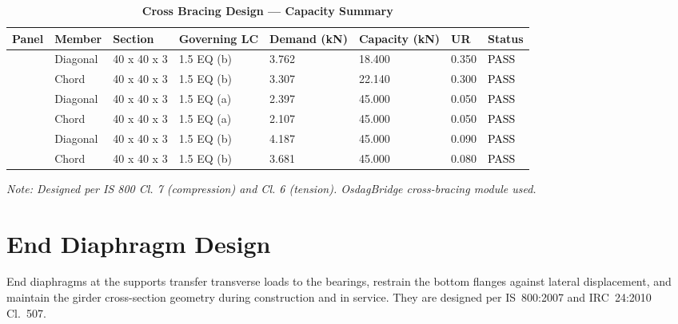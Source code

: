 \documentclass[12pt,a4paper]{report}
\numberwithin{table}{chapter}
\numberwithin{figure}{chapter}
\begin{document}
\vspace{1em}
\begin{longtable}{|C{2.0cm}|L{1.8cm}|C{2.2cm}|C{3.0cm}|C{1.8cm}|C{1.8cm}|C{1.2cm}|C{1.8cm}|}
\caption{\textbf{Cross Bracing Design --- Capacity Summary}}
\hline
\textbf{Panel} & \textbf{Member} & \textbf{Section} & \textbf{Governing LC} & \textbf{Demand (kN)} & \textbf{Capacity (kN)} & \textbf{UR} & \textbf{Status} \\[6pt]
\hline
{} & Diagonal & 40 x 40 x 3 & 1.5 EQ (b) & 3.762 & 18.400 & 0.350 & \textcolor{black}{PASS} \\[6pt]
 & Chord & 40 x 40 x 3 & 1.5 EQ (b) & 3.307 & 22.140 & 0.300 & \textcolor{black}{PASS} \\[6pt]
\hline
{} & Diagonal & 40 x 40 x 3 & 1.5 EQ (a) & 2.397 & 45.000 & 0.050 & \textcolor{black}{PASS} \\[6pt]
 & Chord & 40 x 40 x 3 & 1.5 EQ (a) & 2.107 & 45.000 & 0.050 & \textcolor{black}{PASS} \\[6pt]
\hline
{} & Diagonal & 40 x 40 x 3 & 1.5 EQ (b) & 4.187 & 45.000 & 0.090 & \textcolor{black}{PASS} \\[6pt]
 & Chord & 40 x 40 x 3 & 1.5 EQ (b) & 3.681 & 45.000 & 0.080 & \textcolor{black}{PASS} \\[6pt]
\hline
\end{longtable}
\noindent\textit{Note: Designed per IS 800 Cl. 7 (compression) and Cl. 6 (tension). OsdagBridge cross-bracing module used.}

\section{End Diaphragm Design}
\label{sec:end-diaphragm}

End diaphragms at the supports transfer transverse loads to the bearings, restrain the bottom flanges against lateral displacement, and maintain the girder cross-section geometry during construction and in service. They are designed per IS~800:2007 and IRC~24:2010 Cl.~507.

\vspace{1em}

\vspace{0.4em}
\noindent
\setlength{\tabcolsep}{4pt}
\setlength{\LTleft}{0pt}
\setlength{\LTright}{\fill}
\end{document}
